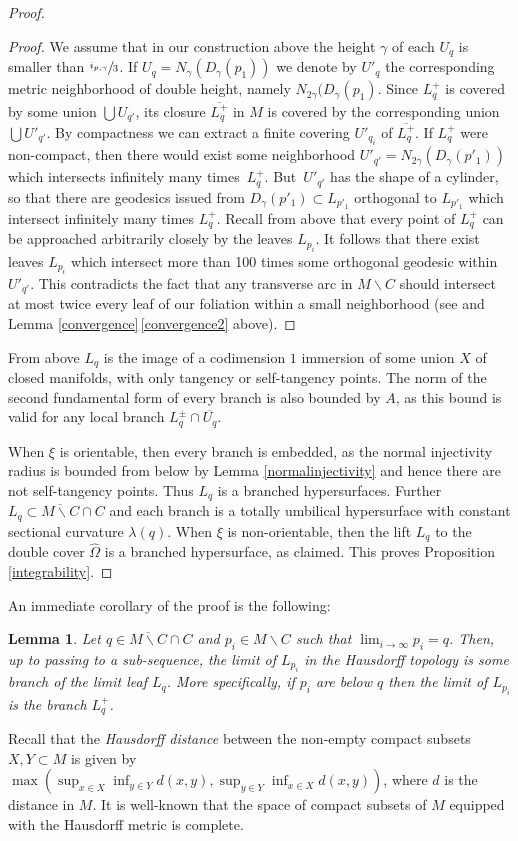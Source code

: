 \documentclass[10pt]{amsart}
\let\moins\smallsetminus
\newtheorem{lemma}[theorem]{Lemma}
\theoremstyle{definition}
\theoremstyle{remark}
\numberwithin{equation}{section}
\begin{document}
\begin{proof}
\begin{proof}
We assume that in our construction above the height $\gamma$ of each $U_q$
is smaller than $\sfrac{i_{p,\gamma}}{3}$. If $U_q=N_{\gamma}(D_{\gamma}(p_1))$ we denote by $U'_q$ the corresponding metric neighborhood of
double height, namely $N_{2\gamma}(D_{\gamma}(p_1)$.
Since $L^+_q$ is covered by some union $\bigcup U_{q'}$, its closure $\overline{L^+_q}$ in $M$ is
covered by the corresponding union $\bigcup U'_{q'}$. By compactness we can extract a finite covering $U'_{q_i}$ of $\overline{L^+_q}$.
If $L^+_q$ were non-compact, then there would exist some neighborhood
$U'_{q'}=N_{2\gamma}(D_{\gamma}(p'_1))$ which intersects infinitely many times~$L^+_q$.
But~$U'_{q'}$ has the shape of a cylinder, so that there are geodesics issued from $D_{\gamma}(p'_1)\subset L_{p'_1}$ orthogonal to $L_{p'_1}$
which intersect infinitely many times $L^+_q$.
Recall from above that every point of $L^+_q$ can be approached
arbitrarily closely by the leaves $L_{p_i}$. It follows that there exist leaves $L_{p_i}$ which intersect more than 100 times some
orthogonal geodesic within $U'_{q'}$.
This contradicts the fact that any transverse arc in $M\moins C$ should intersect at most twice every leaf of our foliation within a small neighborhood
(see \cite[Lem.\,2, p.\,385]{Hae} and Lemma \ref{convergence}\,\eqref{convergence2} above).
\end{proof}

From above $L_q$ is the image of a codimension $1$ immersion of some union $X$ of closed manifolds,
with only tangency or self-tangency points. The norm of the second fundamental form of every branch is also bounded by $A$,
as this bound is valid for any local branch $L_q^{\pm}\cap \overline{U_q}$.

When $\xi$ is orientable, then every branch is embedded, as the
normal injectivity radius is bounded from below by Lemma \ref{normalinjectivity} and hence there are not
self-tangency points. Thus $L_q$ is a branched hypersurfaces.
Further $L_q\subset \overline{M\moins C}\cap C$ and each branch is a totally umbilical hypersurface with constant sectional
curvature $\lambda(q)$.
When $\xi$ is non-orientable, then the lift $L_q$ to the double cover $\widehat{\Omega}$ is a branched hypersurface, as claimed.
This proves Proposition \ref{integrability}.
\end{proof}

An immediate corollary of the proof is the following:
\begin{lemma}\label{Hausdorff}
Let $q\in \overline{M\moins C}\cap C$ and $p_i\in M\moins C$ such that $\lim_{i\to \infty}p_i=q$. Then, up to passing to a sub-sequence,
the limit of $L_{p_i}$ in the Hausdorff topology is some branch of the limit leaf $L_q$. More specifically, if
$p_i$ are below $q$ then the limit of $L_{p_i}$ is the branch $L_q^+$.
\end{lemma}
Recall that the \emph{Hausdorff distance} between the
non-empty compact subsets \hbox{$X,Y\subset M$} is
given by $\max(\sup_{x\in X} \inf_{y\in Y} d(x,y), \sup_{y\in Y}\inf_{x\in X} d(x,y))$, where
$d$ is the distance in $M$. It is well-known that the space of compact subsets of $M$ equipped with the Hausdorff metric
is complete.
\end{document}
